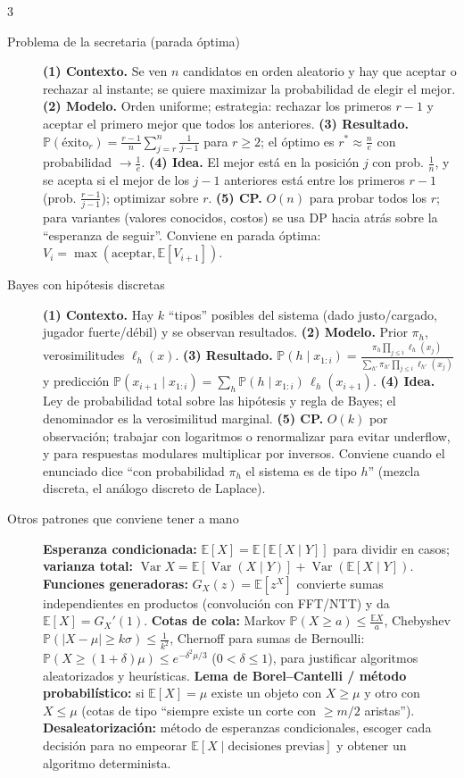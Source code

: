 \documentclass[8pt, spanish, mexico, letterpaper]{extarticle}
\newcommand{\E}{\mathbb{E}}
\newcommand{\Var}{\operatorname{Var}}
\newcommand{\Prob}{\mathbb{P}}
\newcommand{\<}{<}
\begin{document}
\begin{multicols*}{3}
\begin{description}
\item[Problema de la secretaria (parada \'optima)] \textbf{(1) Contexto.} Se ven $n$ candidatos en orden aleatorio y hay que aceptar o rechazar al instante; se quiere maximizar la probabilidad de elegir el mejor. \textbf{(2) Modelo.} Orden uniforme; estrategia: rechazar los primeros $r - 1$ y aceptar el primero mejor que todos los anteriores. \textbf{(3) Resultado.} $\Prob(\text{\'exito}_r)=\frac{r-1}n\sum_{j=r}^n\frac1{j-1}$ para $r\ge2$; el \'optimo es $r^\ast\approx\frac ne$ con probabilidad $\to\frac1e$. \textbf{(4) Idea.} El mejor est\'a en la posici\'on $j$ con prob. $\frac1n$, y se acepta si el mejor de los $j - 1$ anteriores est\'a entre los primeros $r - 1$ (prob. $\frac{r-1}{j-1}$); optimizar sobre $r$. \textbf{(5) CP.} $O(n)$ para probar todos los $r$; para variantes (valores conocidos, costos) se usa DP hacia atr\'as sobre la ``esperanza de seguir''. Conviene en parada \'optima: $V_i=\max(\text{aceptar},\E[V_{i+1}])$.

\item[Bayes con hip\'otesis discretas] \textbf{(1) Contexto.} Hay $k$ ``tipos'' posibles del sistema (dado justo/cargado, jugador fuerte/d\'ebil) y se observan resultados. \textbf{(2) Modelo.} Prior $\pi_h$, verosimilitudes $\ell_h(x)$. \textbf{(3) Resultado.} $\Prob(h\mid x_{1:i})=\frac{\pi_h\prod_{j\le i}\ell_h(x_j)}{\sum_{h'}\pi_{h'}\prod_{j\le i}\ell_{h'}(x_j)}$ y predicci\'on $\Prob(x_{i+1}\mid x_{1:i})=\sum_h\Prob(h\mid x_{1:i})\,\ell_h(x_{i+1})$. \textbf{(4) Idea.} Ley de probabilidad total sobre las hip\'otesis y regla de Bayes; el denominador es la verosimilitud marginal. \textbf{(5) CP.} $O(k)$ por observaci\'on; trabajar con logaritmos o renormalizar para evitar underflow, y para respuestas modulares multiplicar por inversos. Conviene cuando el enunciado dice ``con probabilidad $\pi_h$ el sistema es de tipo $h$'' (mezcla discreta, el an\'alogo discreto de Laplace).

\item[Otros patrones que conviene tener a mano]  \textbf{Esperanza condicionada:} $\E[X]=\E[\E[X\mid Y]]$ para dividir en casos; \textbf{varianza total:} $\Var X=\E[\Var(X\mid Y)]+\Var(\E[X\mid Y])$. \textbf{Funciones generadoras:} $G_X(z)=\E[z^X]$ convierte sumas independientes en productos (convoluci\'on con FFT/NTT) y da $\E[X]=G_X'(1)$. \textbf{Cotas de cola:} Markov $\Prob(X\ge a)\le\frac{\E X}a$, Chebyshev $\Prob(|X-\mu|\ge k\sigma)\le\frac1{k^2}$, Chernoff para sumas de Bernoulli: $\Prob(X\ge(1 + \delta)\mu)\le e^{-\delta^2\mu/3}$ ($0<\delta\le1$), para justificar algoritmos aleatorizados y heur\'isticas. \textbf{Lema de Borel--Cantelli / m\'etodo probabil\'istico:} si $\E[X]=\mu$ existe un objeto con $X\ge\mu$ y otro con $X\le\mu$ (cotas de tipo ``siempre existe un corte con $\ge m/2$ aristas''). \textbf{Desaleatorizaci\'on:} m\'etodo de esperanzas condicionales, escoger cada decisi\'on para no empeorar $\E[X\mid\text{decisiones previas}]$ y obtener un algoritmo determinista.

\end{description}
\clearpage



\end{multicols*}
\end{document}
